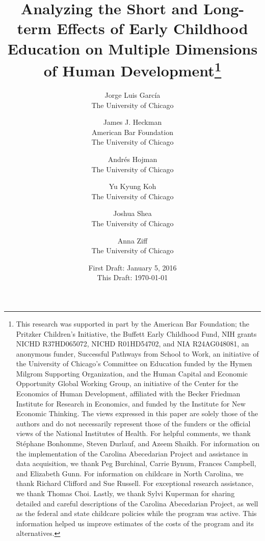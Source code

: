 

% 


\title{\Large \textbf{Analyzing the Short and Long-term Effects of Early Childhood Education on Multiple Dimensions of Human Development}\thanks{This research was supported in part by the American Bar Foundation; the Pritzker Children's Initiative, the
Buffett Early Childhood Fund, NIH grants NICHD R37HD065072, NICHD R01HD54702, and NIA R24AG048081, an
anonymous funder, Successful Pathways from School to Work, an initiative of the University of Chicago's Committee
on Education funded by the Hymen Milgrom Supporting Organization, and the Human Capital and Economic
Opportunity Global Working Group, an initiative of the Center for the Economics of Human Development, affiliated with
the Becker Friedman Institute for Research in Economics, and funded by the Institute for New Economic Thinking. The
views expressed in this paper are solely those of the authors and do not necessarily represent those of the funders or
the official views of the National Institutes of Health. For helpful comments, we thank St\'{e}phane Bonhomme, Steven Durlauf, and Azeem Shaikh. For information on the implementation of the Carolina Abecedarian Project and assistance in data acquisition, we thank Peg Burchinal, Carrie Bynum, Frances Campbell, and Elizabeth Gunn. For information on childcare in North Carolina, we thank Richard Clifford and Sue Russell. For exceptional research assistance, we thank Thomas Choi. Lastly, we thank Sylvi Kuperman for sharing detailed and careful descriptions of the Carolina Abecedarian Project, as well as the federal and state childcare policies while the program was active. This information helped us improve estimates of the costs of the program and its alternatives.}}

\author{
Jorge Luis Garc\'{i}a\\
The University of Chicago \and
James J. Heckman \\
American Bar Foundation \\
The University of Chicago \and
Andr\'{e}s Hojman\\
The University of Chicago \and
Yu Kyung Koh \\ 
The University of Chicago \and
Joshua Shea \\
The University of Chicago \and
Anna Ziff \\ 
The University of Chicago}
\date{First Draft: January 5, 2016\\ This Draft: \today}
\maketitle

